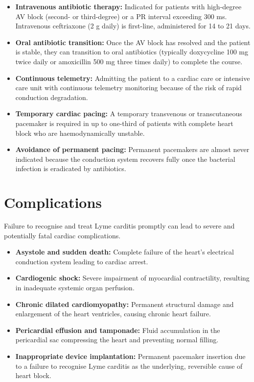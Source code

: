 \begin{itemize}
    \item \textbf{Intravenous antibiotic therapy:} Indicated for patients with high-degree AV block (second- or third-degree) or a PR interval exceeding 300 ms. Intravenous ceftriaxone (2 g daily) is first-line, administered for 14 to 21 days.
    \item \textbf{Oral antibiotic transition:} Once the AV block has resolved and the patient is stable, they can transition to oral antibiotics (typically doxycycline 100 mg twice daily or amoxicillin 500 mg three times daily) to complete the course.
    \item \textbf{Continuous telemetry:} Admitting the patient to a cardiac care or intensive care unit with continuous telemetry monitoring because of the risk of rapid conduction degradation.
    \item \textbf{Temporary cardiac pacing:} A temporary transvenous or transcutaneous pacemaker is required in up to one-third of patients with complete heart block who are haemodynamically unstable.
    \item \textbf{Avoidance of permanent pacing:} Permanent pacemakers are almost never indicated because the conduction system recovers fully once the bacterial infection is eradicated by antibiotics.
\end{itemize}

\section*{Complications}
Failure to recognise and treat Lyme carditis promptly can lead to severe and potentially fatal cardiac complications.

\begin{itemize}
    \item \textbf{Asystole and sudden death:} Complete failure of the heart's electrical conduction system leading to cardiac arrest.
    \item \textbf{Cardiogenic shock:} Severe impairment of myocardial contractility, resulting in inadequate systemic organ perfusion.
    \item \textbf{Chronic dilated cardiomyopathy:} Permanent structural damage and enlargement of the heart ventricles, causing chronic heart failure.
    \item \textbf{Pericardial effusion and tamponade:} Fluid accumulation in the pericardial sac compressing the heart and preventing normal filling.
    \item \textbf{Inappropriate device implantation:} Permanent pacemaker insertion due to a failure to recognise Lyme carditis as the underlying, reversible cause of heart block.
\end{itemize}

